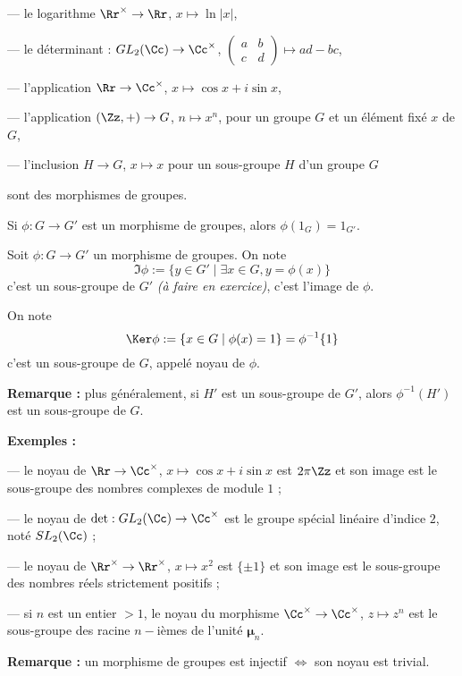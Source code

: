 \documentclass[class=report,crop=false]{standalone}
\newcommand{\GL}{GL}
\newcommand{\SL}{SL}
\newcommand{\exoo}{\emph{(à faire en exercice)}}
\begin{document}
--- le logarithme  $\Rr^\times \to \Rr$, $x \mapsto \ln |x|$,

--- le déterminant : $\GL_2(\Cc) \to \Cc^\times$, $\left(\begin{array}{cc}
a & b\\
c& d
\end{array}\right) \mapsto ad-bc$,

--- l'application $\Rr \to \Cc^\times$, $x \mapsto \cos x + i \sin x$,

--- l'application $(\Zz,+) \to G$, $n \mapsto x^n$, pour un groupe $G$ et un élément fixé $x $ de $G$, 

--- l'inclusion $H \to G$, $ x \mapsto x$ pour un sous-groupe $H $ d'un groupe $G$

sont des morphismes de groupes.

\begin{proposition}
Si $\phi : G \to G'$ est un morphisme de groupes, alors $\phi(1_G) = 1_{G'}$.
\end{proposition}

\begin{definition}
Soit $\phi : G \to G'$ un morphisme de groupes. On note \[\Im \phi := \{y \in G' \mid \exists x \in G , y = \phi(x)\} \]
c'est un sous-groupe de $G'$ \exoo, c'est l'image de $\phi$.

On note \[\Ker \phi := \{x \in G \mid \phi(x) =1\}=\phi^{-1}{\{1\}}\]
c'est un sous-groupe de $G$, appelé noyau de $\phi$.
\end{definition}

{\bf Remarque :} plus généralement, si $H'$ est un sous-groupe de $G'$, alors $\phi^{-1}(H')$ est un sous-groupe de $G$.

{\bf Exemples :} 

--- le noyau de $\Rr \to \Cc^\times$, $x \mapsto \cos x +i \sin x$ est $2\pi \Zz$ et son image est le sous-groupe des nombres complexes de module $1$ ;

--- le noyau de $\det : \GL_2(\Cc) \to \Cc^\times$ est le groupe spécial linéaire d'indice $2$, noté $\SL_2(\Cc)$ ;

--- le noyau de $\Rr^\times \to \Rr^\times$, $x \mapsto x^2$ est $\{\pm 1\}$ et son image est le sous-groupe des nombres réels strictement positifs ;

--- si $n $ est un entier $>1$, le noyau du morphisme $\Cc^\times \to \Cc^\times$, $z \mapsto z^n$ est le sous-groupe des racine $n-$ièmes de l'unité $\mathbf{\mu}_n$.

{\bf Remarque :} un morphisme de groupes est injectif $\iff $ son noyau est trivial.
\end{document}
